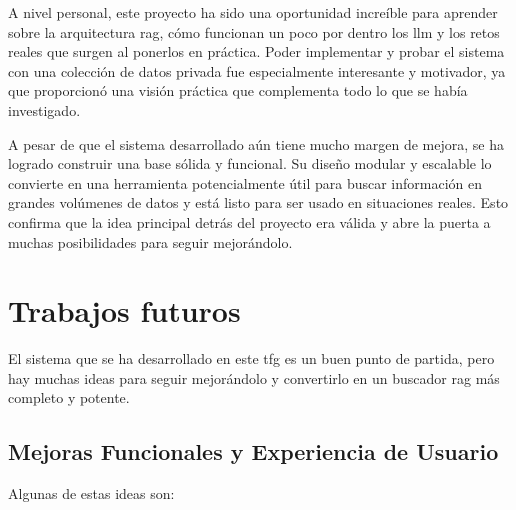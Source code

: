 A nivel personal, este proyecto ha sido una oportunidad increíble para aprender sobre la arquitectura \gls{rag}, cómo funcionan un poco por dentro los \gls{llm} y los retos reales que surgen al ponerlos en práctica. Poder implementar y probar el sistema con una colección de datos privada fue especialmente interesante y motivador, ya que proporcionó una visión práctica que complementa todo lo que se había investigado.

A pesar de que el sistema desarrollado aún tiene mucho margen de mejora, se ha logrado construir una base sólida y funcional. Su diseño modular y escalable lo convierte en una herramienta potencialmente útil para buscar información en grandes volúmenes de datos y está listo para ser usado en situaciones reales. Esto confirma que la idea principal detrás del proyecto era válida y abre la puerta a muchas posibilidades para seguir mejorándolo.

\section{Trabajos futuros}
\label{trabajos_futuros}

El sistema que se ha desarrollado en este \gls{tfg} es un buen punto de partida, pero hay muchas ideas para seguir mejorándolo y convertirlo en un buscador \gls{rag} más completo y potente.

\subsection{Mejoras Funcionales y Experiencia de Usuario}
Algunas de estas ideas son:

